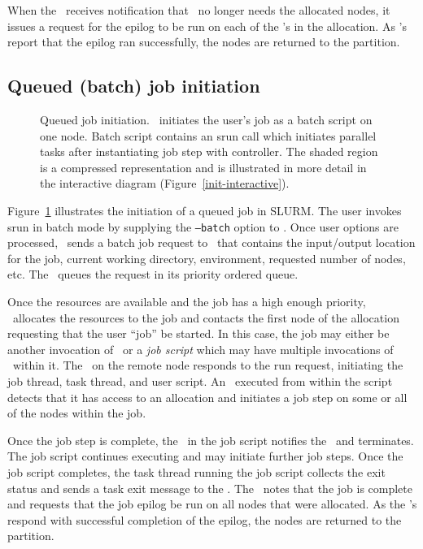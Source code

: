 When the \slurmctld\ receives notification that \srun\ no longer needs
the allocated nodes, it issues a request for the epilog to be run on each of
the \slurmd 's in the allocation. As \slurmd 's report that the epilog ran
successfully, the nodes are returned to the partition.

\subsection{Queued (batch) job initiation}

\begin{figure}[tb]
\centerline{ }
\caption{\small Queued job initiation. 
         \slurmctld\ initiates the user's job as a batch script on one node. 
	 Batch script contains an srun call which initiates parallel tasks 
	 after instantiating job step with controller. The shaded region is 
	 a compressed representation and is illustrated in more detail in the 
	 interactive diagram (Figure~\ref{init-interactive}).}
\label{init-batch}
\end{figure}

Figure~\ref{init-batch} illustrates the initiation of a queued job in SLURM.
The user invokes srun in batch mode by supplying the {\tt --batch} option 
to \srun . Once user options are processed, \srun\ sends a batch job request
to \slurmctld\ that contains the input/output location for the job, current
working directory, environment, requested number of nodes, etc. The 
\slurmctld\ queues the request in its priority ordered queue. 

Once the resources are available and the job has a high enough priority,
\slurmctld\ allocates the resources to the job and contacts the first node 
of the allocation requesting that the user ``job'' be started. In this case,
the job may either be another invocation of \srun\ or a {\em job script} which
may have multiple invocations of \srun\ within it. The \slurmd\ on the remote
node responds to the run request, initiating the job thread, task thread, 
and user script. An \srun\ executed from within the script detects that it
has access to an allocation and initiates a job step on some or all of the
nodes within the job.

Once the job step is complete, the \srun\ in the job script notifies the
\slurmctld\, and terminates. The job script continues executing and may
initiate further job steps. Once the job script completes, the task
thread running the job script collects the exit status and sends a task exit
message to the \slurmctld . The \slurmctld\ notes that the job is complete
and requests that the job epilog be run on all nodes that were allocated.
As the \slurmd 's respond with successful completion of the epilog, 
the nodes are returned to the partition.

